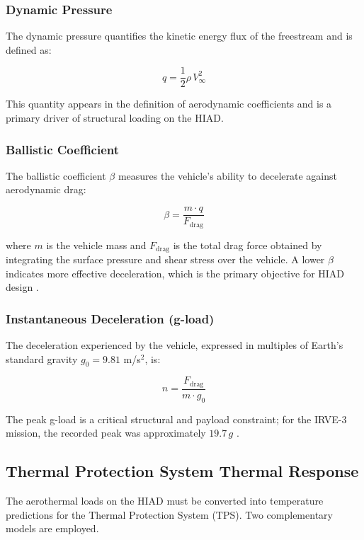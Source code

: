 \subsubsection*{Dynamic Pressure}
The dynamic pressure quantifies the kinetic energy flux of the freestream and is defined as:

\begin{equation}
    q = \frac{1}{2} \rho \, V_{\infty}^{2}
    \label{eq:dynamic_pressure}
\end{equation}

\noindent This quantity appears in the definition of aerodynamic coefficients and is a primary driver of structural loading on the HIAD.

\subsubsection*{Ballistic Coefficient}
The ballistic coefficient $\beta$ measures the vehicle's ability to decelerate against aerodynamic drag:

\begin{equation}
    \beta = \frac{m \cdot q}{F_{\text{drag}}}
    \label{eq:ballistic_coefficient}
\end{equation}

\noindent where $m$ is the vehicle mass and $F_{\text{drag}}$ is the total drag force obtained by integrating the surface pressure and shear stress over the vehicle. A lower $\beta$ indicates more effective deceleration, which is the primary objective for HIAD design \cite{AndersonHypersonic}.

\subsubsection*{Instantaneous Deceleration (g-load)}
The deceleration experienced by the vehicle, expressed in multiples of Earth's standard gravity $g_0 = 9.81$ m/s$^{2}$, is:

\begin{equation}
    n = \frac{F_{\text{drag}}}{m \cdot g_0}
    \label{eq:gload}
\end{equation}

\noindent The peak g-load is a critical structural and payload constraint; for the IRVE-3 mission, the recorded peak was approximately $19.7\,g$ \cite{old2013irve3postflight}.

\subsection{Thermal Protection System Thermal Response}
The aerothermal loads on the HIAD must be converted into temperature predictions for the Thermal Protection System (TPS). Two complementary models are employed.

